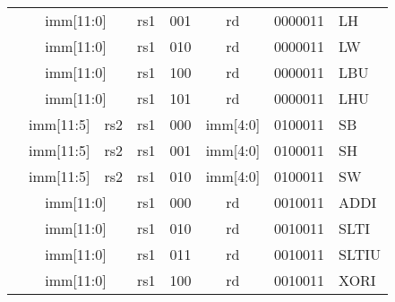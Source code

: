 \begin{table}[p]
\begin{small}
\begin{center}
\begin{tabular}{p{0in}p{0.4in}p{0.05in}p{0.05in}p{0.05in}p{0.05in}p{0.4in}p{0.6in}p{0.4in}p{0.6in}p{0.7in}l}
&
\multicolumn{6}{|c|}{imm[11:0]} &
\multicolumn{1}{c|}{rs1} &
\multicolumn{1}{c|}{001} &
\multicolumn{1}{c|}{rd} &
\multicolumn{1}{c|}{0000011} & LH \\
\cline{2-11}


&
\multicolumn{6}{|c|}{imm[11:0]} &
\multicolumn{1}{c|}{rs1} &
\multicolumn{1}{c|}{010} &
\multicolumn{1}{c|}{rd} &
\multicolumn{1}{c|}{0000011} & LW \\
\cline{2-11}


&
\multicolumn{6}{|c|}{imm[11:0]} &
\multicolumn{1}{c|}{rs1} &
\multicolumn{1}{c|}{100} &
\multicolumn{1}{c|}{rd} &
\multicolumn{1}{c|}{0000011} & LBU \\
\cline{2-11}


&
\multicolumn{6}{|c|}{imm[11:0]} &
\multicolumn{1}{c|}{rs1} &
\multicolumn{1}{c|}{101} &
\multicolumn{1}{c|}{rd} &
\multicolumn{1}{c|}{0000011} & LHU \\
\cline{2-11}


&
\multicolumn{4}{|c|}{imm[11:5]} &
\multicolumn{2}{c|}{rs2} &
\multicolumn{1}{c|}{rs1} &
\multicolumn{1}{c|}{000} &
\multicolumn{1}{c|}{imm[4:0]} &
\multicolumn{1}{c|}{0100011} & SB \\
\cline{2-11}


&
\multicolumn{4}{|c|}{imm[11:5]} &
\multicolumn{2}{c|}{rs2} &
\multicolumn{1}{c|}{rs1} &
\multicolumn{1}{c|}{001} &
\multicolumn{1}{c|}{imm[4:0]} &
\multicolumn{1}{c|}{0100011} & SH \\
\cline{2-11}


&
\multicolumn{4}{|c|}{imm[11:5]} &
\multicolumn{2}{c|}{rs2} &
\multicolumn{1}{c|}{rs1} &
\multicolumn{1}{c|}{010} &
\multicolumn{1}{c|}{imm[4:0]} &
\multicolumn{1}{c|}{0100011} & SW \\
\cline{2-11}


&
\multicolumn{6}{|c|}{imm[11:0]} &
\multicolumn{1}{c|}{rs1} &
\multicolumn{1}{c|}{000} &
\multicolumn{1}{c|}{rd} &
\multicolumn{1}{c|}{0010011} & ADDI \\
\cline{2-11}


&
\multicolumn{6}{|c|}{imm[11:0]} &
\multicolumn{1}{c|}{rs1} &
\multicolumn{1}{c|}{010} &
\multicolumn{1}{c|}{rd} &
\multicolumn{1}{c|}{0010011} & SLTI \\
\cline{2-11}


&
\multicolumn{6}{|c|}{imm[11:0]} &
\multicolumn{1}{c|}{rs1} &
\multicolumn{1}{c|}{011} &
\multicolumn{1}{c|}{rd} &
\multicolumn{1}{c|}{0010011} & SLTIU \\
\cline{2-11}


&
\multicolumn{6}{|c|}{imm[11:0]} &
\multicolumn{1}{c|}{rs1} &
\multicolumn{1}{c|}{100} &
\multicolumn{1}{c|}{rd} &
\multicolumn{1}{c|}{0010011} & XORI \\
\cline{2-11}



\end{tabular}
\end{center}
\end{small}
\end{table}
